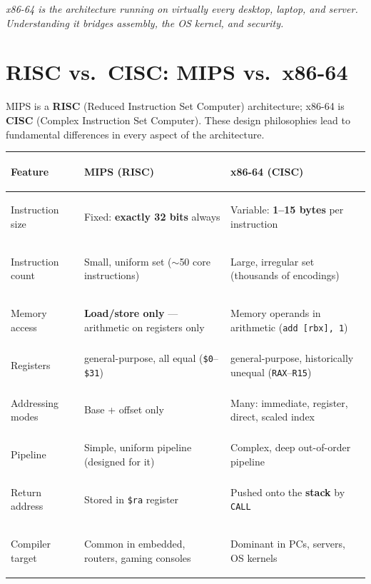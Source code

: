 \documentclass[11pt, letterpaper]{article}
\begin{document}
\vspace{6pt}
\begin{center}\small\itshape
  x86-64 is the architecture running on virtually every desktop, laptop, and server.
  Understanding it bridges assembly, the OS kernel, and security.
\end{center}

\section*{RISC vs.\ CISC: MIPS vs.\ x86-64}

MIPS is a \textbf{RISC} (Reduced Instruction Set Computer) architecture; x86-64 is \textbf{CISC} (Complex Instruction Set Computer). These design philosophies lead to fundamental differences in every aspect of the architecture.

\noindent
{\renewcommand{\arraystretch}{1.6}
\begin{tabularx}{\textwidth}{>{\bfseries\raggedright\arraybackslash}p{4cm}
                              >{\raggedright\arraybackslash}X
                              >{\raggedright\arraybackslash}X}
\toprule
\rowcolor{tableheaderred}
\textbf{Feature} & \textbf{MIPS (RISC)} & \textbf{x86-64 (CISC)} \\
\midrule
\rowcolor{rowRe} Instruction size      & Fixed: \textbf{exactly 32 bits} always & Variable: \textbf{1--15 bytes} per instruction \\
\rowcolor{rowA}  Instruction count     & Small, uniform set ($\sim$50 core instructions) & Large, irregular set (thousands of encodings) \\
\rowcolor{rowRe} Memory access         & \textbf{Load/store only} --- arithmetic on registers only & Memory operands in arithmetic (\texttt{add [rbx], 1}) \\
\rowcolor{rowA}  Registers             & 32 general-purpose, all equal (\texttt{\$0}--\texttt{\$31}) & 16 general-purpose, historically unequal (\texttt{RAX}--\texttt{R15}) \\
\rowcolor{rowRe} Addressing modes      & Base + offset only & Many: immediate, register, direct, scaled index \\
\rowcolor{rowA}  Pipeline              & Simple, uniform pipeline (designed for it) & Complex, deep out-of-order pipeline \\
\rowcolor{rowRe} Return address        & Stored in \texttt{\$ra} register & Pushed onto the \textbf{stack} by \texttt{CALL} \\
\rowcolor{rowA}  Compiler target       & Common in embedded, routers, gaming consoles & Dominant in PCs, servers, OS kernels \\
\bottomrule
\end{tabularx}}
\end{document}
